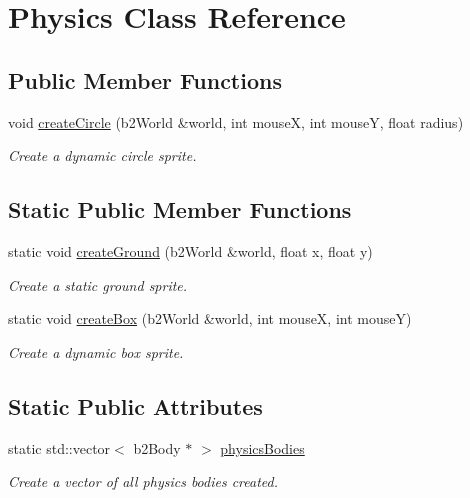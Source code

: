 \hypertarget{class_physics}{}\section{Physics Class Reference}
\label{class_physics}
\subsection*{Public Member Functions}
\begin{DoxyCompactItemize}
\item 
void \hyperlink{class_physics_aa96588091a5f548bcbd3e93930bec919}{create\+Circle} (b2\+World \&world, int mouseX, int mouseY, float radius)
\begin{DoxyCompactList}\small\item\em Create a dynamic circle sprite. \end{DoxyCompactList}\end{DoxyCompactItemize}
\subsection*{Static Public Member Functions}
\begin{DoxyCompactItemize}
\item 
static void \hyperlink{class_physics_af59917c046b199565db48749b67e40b9}{create\+Ground} (b2\+World \&world, float x, float y)
\begin{DoxyCompactList}\small\item\em Create a static ground sprite. \end{DoxyCompactList}\item 
static void \hyperlink{class_physics_ada8fc01ca58dca7c2dc221a73f9816ec}{create\+Box} (b2\+World \&world, int mouseX, int mouseY)
\begin{DoxyCompactList}\small\item\em Create a dynamic box sprite. \end{DoxyCompactList}\end{DoxyCompactItemize}
\subsection*{Static Public Attributes}
\begin{DoxyCompactItemize}
\item 
\mbox{\label{class_physics_a12f73191c1306ae4376d5934c83a4ae6}} 
static std\+::vector$<$ b2\+Body $\ast$ $>$ \hyperlink{class_physics_a12f73191c1306ae4376d5934c83a4ae6}{physics\+Bodies}
\begin{DoxyCompactList}\small\item\em Create a vector of all physics bodies created. \end{DoxyCompactList}\end{DoxyCompactItemize}


